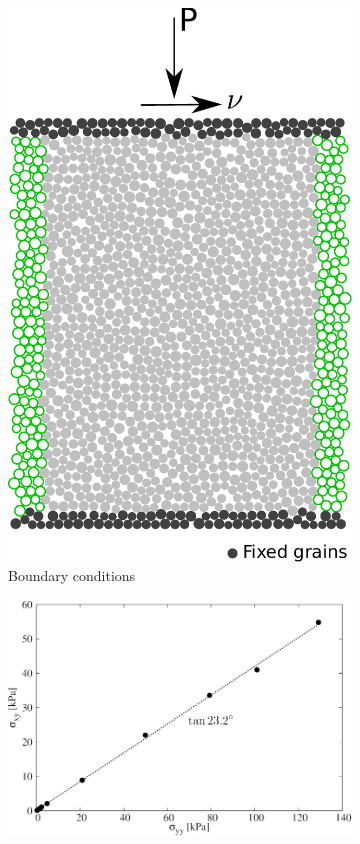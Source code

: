 \begin{figure}
\centering
\begin{subfigure}[b]{0.4\textwidth}
\centering
\includegraphics[width=\textwidth]{simple_shear}
\caption{Boundary conditions}
\label{fig:shear}
\end{subfigure}
\begin{subfigure}[b]{0.575\textwidth}
\centering
\includegraphics[width=\textwidth]{Sxy_vs_Syy}

\end{subfigure}
\end{figure}
